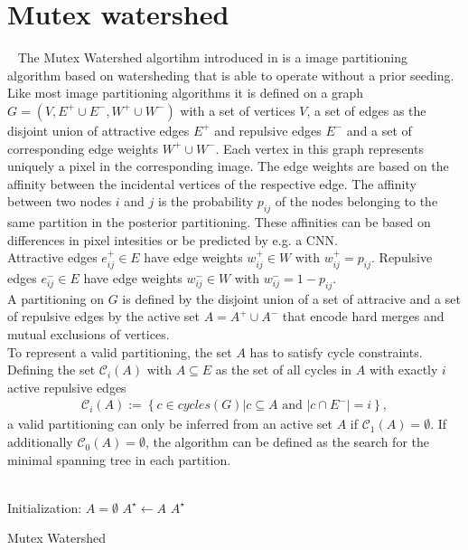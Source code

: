 \section{Mutex watershed}~\label{sec:mtx_wtsd}
The Mutex Watershed algortihm introduced in \cite{wolf2019mutex} is a image partitioning algorithm based on watersheding that is able to operate without a prior seeding.\\
Like most image partitioning algorithms it is defined on a graph $G=(V, E^+ \cup E^-, W^+ \cup W^-)$ with a set of vertices $V$, a set of edges as the disjoint union of attractive edges $E^+$ and repulsive edges $E^-$ and a set of corresponding edge weights $ W^+ \cup W^-$. Each vertex in this graph represents uniquely a pixel in the corresponding image. The edge weights are based on the affinity between the incidental vertices of the respective edge. The affinity between two nodes $i$ and $j$ is the probability $p_{ij}$ of the nodes belonging to the same partition in the posterior partitioning. These affinities can be based on differences in pixel intesities or be predicted by e.g. a CNN. \\
Attractive edges $e_{ij}^+ \in E$ have edge weights $w_{ij}^+ \in W$ with $w_{ij}^+ = p_{ij}$. Repulsive edges $e_{ij}^- \in E$ have edge weights $w_{ij}^- \in W$ with $w_{ij}^- = 1-p_{ij}$. \\
A partitioning on $G$ is defined by the disjoint union of a set of attracive and a set of repulsive edges by the active set $A=A^+ \cup A^-$ that encode hard merges and mutual exclusions of vertices.\\
To represent a valid partitioning, the set $A$ has to satisfy cycle constraints. Defining the set $\mathcal{C}_i(A)$  with $A\subseteq E$ as the set of all cycles in $A$ with exactly $i$ active repulsive edges
\begin{align}
	\mathcal{C}_i(A) := \left\{ c \in cycles(G) \vert c \subseteq A \text{  and  } |c \cap E^- | = i \right\},
\end{align}
a valid partitioning can only be inferred from an active set $A$ if $\mathcal{C}_1(A) = \emptyset $. If additionally $\mathcal{C}_0(A) = \emptyset $, the algorithm can be defined as the search for the minimal spanning tree in each partition.\\
\vspace{8mm}\\
\begin{algorithm}[H]
	Initialization: $A = \emptyset$\;
	$A^\star \leftarrow A$ \;
	\Return $A^\star$
	\caption{Mutex Watershed \cite{wolf2019mutex}}
	\label{algo:mtx_wtsd}
\end{algorithm}
\vspace{8mm}

